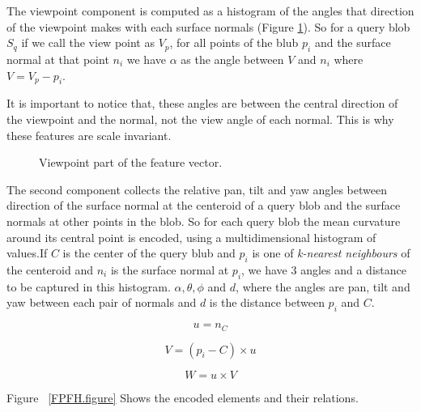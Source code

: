 The viewpoint component is computed as a histogram of the angles that direction of the viewpoint  makes with each surface
normals (Figure \ref{VFH_ViewPoint_component.figure}). So for a query blob $S_q$ if we call the view point as $V_p$, for all points of the blub $p_i$ and the surface normal at that point $n_i$ we have $\alpha$ as the angle between $V$ and $n_i$ where $V = V_p - p_i$.


It is important to notice that, these angles are between the central direction of the viewpoint and the normal, not the view angle of
each normal. This is why these features are scale invariant.  

\begin{figure}[t]
  \caption[ViewPoint Component of VFH]
  {Viewpoint part of the feature vector.\cite{VFH_Definition}}
  \label{VFH_ViewPoint_component.figure}
\end{figure}

The second component collects the relative pan, tilt and yaw angles between direction of 
the surface normal at the centeroid of a query blob and the surface normals at other points in the blob.
So for each query blob the mean curvature around its central point is encoded, using a multidimensional histogram of values.If $C$ is the center of the query blub and $p_i$ is one of {\it k-nearest neighbours} of the centeroid and $n_i$ is the surface normal at $p_i$, we have 3 angles and a distance to be captured in this histogram. $\alpha,\theta, \phi$ and $d$, where the angles are pan, tilt and yaw between each pair of normals and $d$ is the distance between $p_i$ and $C$.  


\begin{equation}
 \label{VFH_geometry.eq}
    u = n_C
\end{equation}

\begin{equation}
 V = (p_i -C) \times u
\end{equation}

\begin{equation}
 W = u \times V
\end{equation}

    
Figure  ~\ref{FPFH.figure} Shows the encoded elements and their relations.

